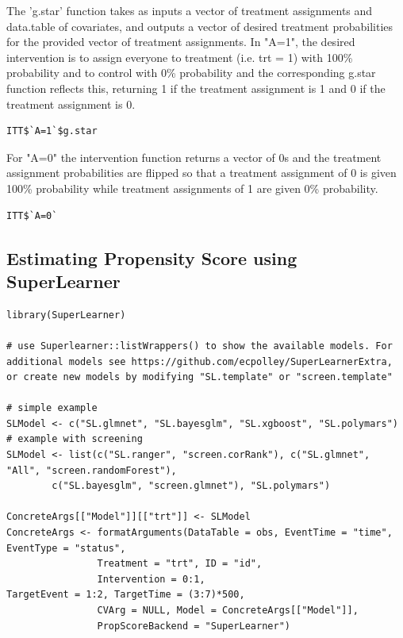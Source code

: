 \documentclass{report}
\newcommand{\1}{\ensuremath{\mathbf{1}}}
\begin{document}
The 'g.star' function takes as inputs a vector of treatment assignments and data.table of covariates, and outputs a vector of desired treatment probabilities for the provided vector of treatment assignments. In "A=1", the desired intervention is to assign everyone to treatment (i.e. trt = 1) with 100\% probability and to control with 0\% probability and the corresponding g.star function reflects this, returning 1 if the treatment assignment is 1 and 0 if the treatment assignment is 0.

\begin{lstlisting}
ITT$`A=1`$g.star
\end{lstlisting}

For "A=0" the intervention function returns a vector of 0s and the treatment assignment probabilities are flipped so that a treatment assignment of 0 is given 100\% probability while treatment assignments of 1 are given 0\% probability.

\begin{lstlisting}
ITT$`A=0`
\end{lstlisting}

\subsection{Estimating Propensity Score using SuperLearner}
\label{sec:orgde8f2e0}


\begin{lstlisting}
library(SuperLearner)

# use Superlearner::listWrappers() to show the available models. For additional models see https://github.com/ecpolley/SuperLearnerExtra, or create new models by modifying "SL.template" or "screen.template"

# simple example
SLModel <- c("SL.glmnet", "SL.bayesglm", "SL.xgboost", "SL.polymars")
# example with screening
SLModel <- list(c("SL.ranger", "screen.corRank"), c("SL.glmnet", "All", "screen.randomForest"), 
		c("SL.bayesglm", "screen.glmnet"), "SL.polymars")

ConcreteArgs[["Model"]][["trt"]] <- SLModel
ConcreteArgs <- formatArguments(DataTable = obs, EventTime = "time", EventType = "status", 
				Treatment = "trt", ID = "id", 
				Intervention = 0:1,
TargetEvent = 1:2, TargetTime = (3:7)*500, 
				CVArg = NULL, Model = ConcreteArgs[["Model"]], 
				PropScoreBackend = "SuperLearner")
\end{lstlisting}
\end{document}

